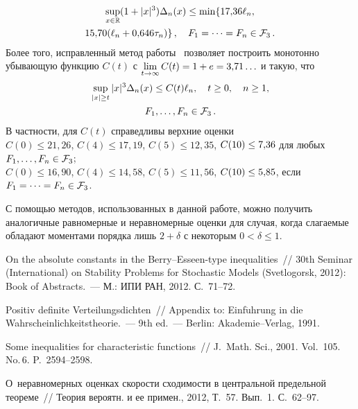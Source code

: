 \begin{multicols}{2}
\noindent
\begin{multline*}
\sup\limits_{x\in\mathbb R}(1+|x|^3)\Delta_n(x)\le \min\{ 17{,}36\ell_n,\\
15{,}70(\ell_n+0{,}646\tau_n)\}\,,\quad F_1=\cdots=F_n\in{\mathcal F}_3\,.
\end{multline*}
Более того, исправленный метод работы~\cite{NefedovaShevtsova2012}
позволяет построить монотонно убывающую функцию $C(t)$ с
$\lim\limits_{t\to\infty}C(t)\hm=1\hm+e\hm=3{,}71\ldots$ и такую, что
\begin{multline*}
\sup\limits_{|x|\ge t}|x|^3\Delta_n(x)\le C(t)\ell_n,\quad t\ge0,\quad n\ge1,\\
F_1,\ldots,F_n\in{\mathcal F}_3\,.
\end{multline*}
В частности, для $C(t)$ справедливы верхние оценки
\\
$C(0)\le21{,}26$, $C(4)\le17{,}19$, $C(5)\le12{,}35$, $C(10)\hm\le7{,}36$ для
любых $F_1,\ldots,F_n\in{\mathcal F}_3$;
\\
$C(0)\le16{,}90$, $C(4)\le14{,}58$, $C(5)\le11{,}56$, $C(10)\hm\le5{,}85$, если
$F_1\hm=\cdots=F_n\hm\in\F_3$.

С помощью методов, использованных в данной работе, можно получить
аналогичные равномерные и неравномерные оценки для случая, когда
слагаемые обладают моментами порядка лишь $2+\delta$ с некоторым
$0<\delta\le1$.

{\small\frenchspacing
{%
\begin{thebibliography}{9}

 On the absolute constants in the
Berry--Esseen-type inequalities~// 30th  Seminar (International) on
Stability Problems for Stochastic Models (Svetlogorsk, 2012): Book
of Abstracts.~--- М.: ИПИ РАН, 2012. С.~71--72.



 Positiv definite Verteilungsdichten~//
Appendix to:   Einf$\ddot{\mbox{u}}$hrung in die
Wahrscheinlichkeitstheorie.~--- 9th ed.~--- Berlin:
Akademie--Verlag, 1991.

 Some inequalities for
characteristic functions~// J.~Math. Sci., 2001. Vol.~105. No.\,6.
P.~2594--2598.

\label{end\stat}

 О~неравномерных оценках
скорости сходимости в центральной предельной теореме~// Теория
вероятн. и ее примен., 2012, Т.~57. Вып.~1. С.~62--97.
\end{thebibliography}
}
}

\end{multicols}